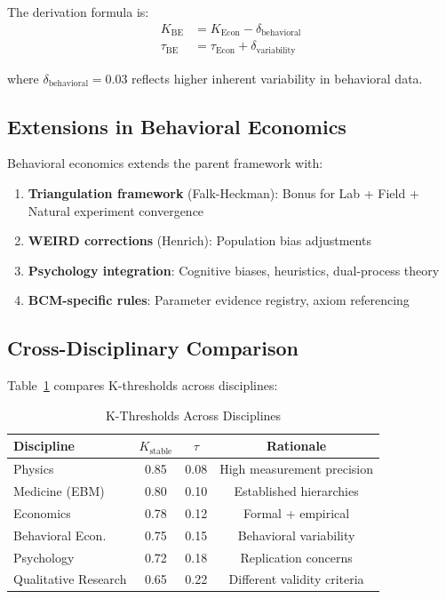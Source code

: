 \documentclass[11pt,a4paper]{article}
\begin{document}
The derivation formula is:
\begin{align}
K_{\text{BE}} &= K_{\text{Econ}} - \delta_{\text{behavioral}} \\
\tau_{\text{BE}} &= \tau_{\text{Econ}} + \delta_{\text{variability}}
\end{align}

where $\delta_{\text{behavioral}} = 0.03$ reflects higher inherent
variability in behavioral data.

\subsection{Extensions in Behavioral Economics}

Behavioral economics extends the parent framework with:

\begin{enumerate}
    \item \textbf{Triangulation framework} (Falk-Heckman): Bonus for
    Lab + Field + Natural experiment convergence
    \item \textbf{WEIRD corrections} (Henrich): Population bias adjustments
    \item \textbf{Psychology integration}: Cognitive biases, heuristics,
    dual-process theory
    \item \textbf{BCM-specific rules}: Parameter evidence registry,
    axiom referencing
\end{enumerate}

\subsection{Cross-Disciplinary Comparison}

Table~\ref{tab:cross-discipline} compares K-thresholds across disciplines:

\begin{table}[h]
\centering
\caption{K-Thresholds Across Disciplines}
\label{tab:cross-discipline}
\begin{tabular}{lccc}
\toprule
\textbf{Discipline} & $K_{\text{stable}}$ & $\tau$ & \textbf{Rationale} \\
\midrule
Physics & 0.85 & 0.08 & High measurement precision \\
Medicine (EBM) & 0.80 & 0.10 & Established hierarchies \\
Economics & 0.78 & 0.12 & Formal + empirical \\
Behavioral Econ. & 0.75 & 0.15 & Behavioral variability \\
Psychology & 0.72 & 0.18 & Replication concerns \\
Qualitative Research & 0.65 & 0.22 & Different validity criteria \\
\bottomrule
\end{tabular}
\end{table}
\end{document}
